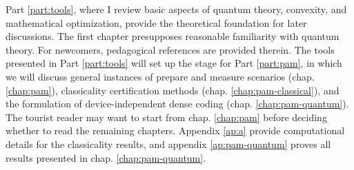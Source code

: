 
Part \ref{part:tools}, where I review basic aspects of quantum theory, convexity, and mathematical optimization, provide the theoretical foundation for later discussions. The first chapter presupposes reasonable familiarity with quantum theory. For newcomers, pedagogical references are provided therein. The tools presented in Part \ref{part:tools} will set up the stage for Part \ref{part:pam}, in which we will discuss general instances of prepare and measure scenarios (chap. \ref{chap:pam}), classicality certification methods (chap. \ref{chap:pam-classical}), and the formulation of device-independent dense coding (chap. \ref{chap:pam-quantum}). The tourist reader may want to start from chap. \ref{chap:pam} before deciding whether to read the remaining chapters. Appendix \ref{ap:a} provide computational details for the classicality results, and appendix \ref{ap:pam-quantum} proves all results presented in chap. \ref{chap:pam-quantum}.